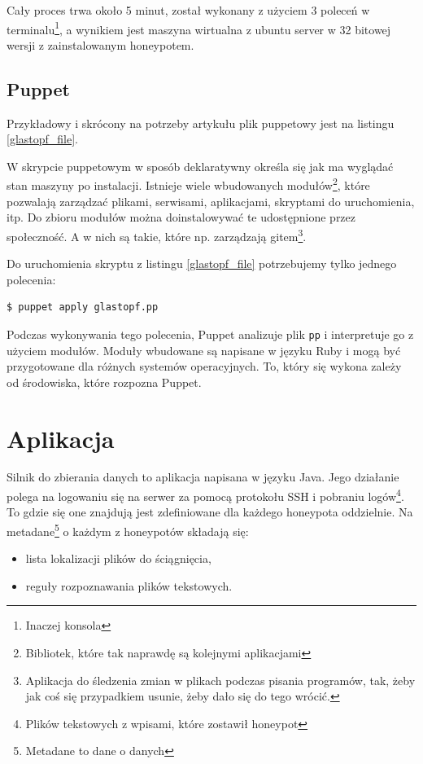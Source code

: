 \documentclass[runningheads,a4paper]{llncs}
\begin{document}
Cały proces trwa około 5 minut, został wykonany z użyciem 3 poleceń w terminalu\footnote{Inaczej konsola}, a wynikiem jest maszyna wirtualna z ubuntu server w 32 bitowej wersji z zainstalowanym honeypotem.

\subsection*{Puppet}

Przykładowy i skrócony na potrzeby artykułu plik puppetowy jest na listingu \ref{glastopf_file}.

\begin{glastopf_listing}[h]

\end{glastopf_listing}

W skrypcie puppetowym w sposób deklaratywny określa się jak ma wyglądać stan maszyny po instalacji. Istnieje wiele wbudowanych modułów\footnote{Bibliotek, które tak naprawdę są kolejnymi aplikacjami}, które pozwalają zarządzać plikami, serwisami, aplikacjami, skryptami do uruchomienia, itp. Do zbioru modułów można doinstalowywać te udostępnione przez społeczność. A w nich są takie, które np. zarządzają gitem\footnote{Aplikacja do śledzenia zmian w plikach podczas pisania programów, tak, żeby jak coś się przypadkiem usunie, żeby dało się do tego wrócić.}.

Do uruchomienia skryptu z listingu \ref{glastopf_file} potrzebujemy tylko jednego polecenia:
\begin{lstlisting}
$ puppet apply glastopf.pp
\end{lstlisting}
Podczas wykonywania tego polecenia, Puppet analizuje plik \texttt{pp} i interpretuje go z użyciem modułów. Moduły wbudowane są napisane w języku Ruby i mogą być przygotowane dla różnych systemów operacyjnych. To, który się wykona zależy od środowiska, które rozpozna Puppet.

\section{Aplikacja}

Silnik do zbierania danych to aplikacja napisana w języku Java. Jego działanie polega na logowaniu się na serwer za pomocą protokołu SSH i pobraniu logów\footnote{Plików tekstowych z wpisami, które zostawił honeypot}. To gdzie się one znajdują jest zdefiniowane dla każdego honeypota oddzielnie. Na metadane\footnote{Metadane to dane o danych} o każdym z honeypotów składają się:
\begin{itemize}
\item lista lokalizacji plików do ściągnięcia,
\item reguły rozpoznawania plików tekstowych.
\end{itemize}
\end{document}
